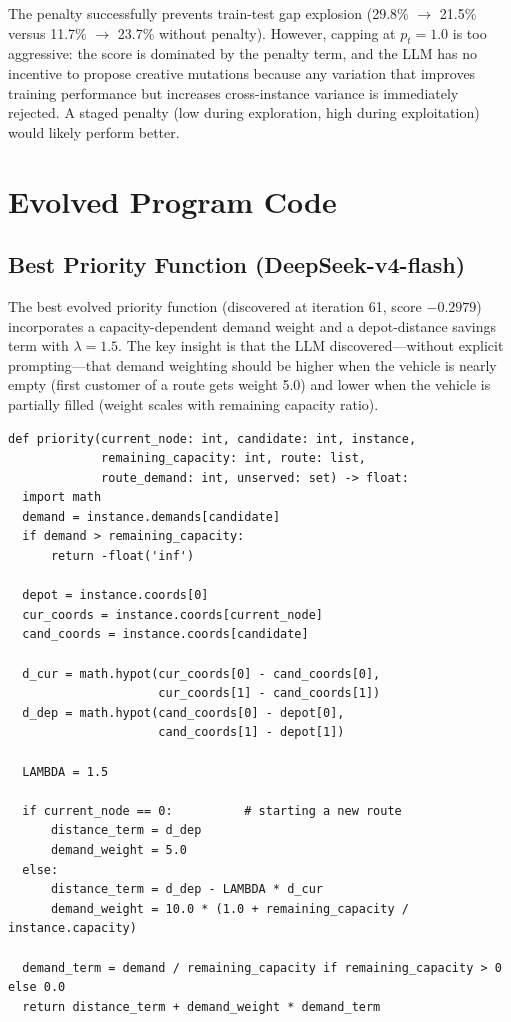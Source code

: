 \documentclass{article}
\begin{document}
The penalty successfully prevents train-test gap explosion (29.8\% $\to$ 21.5\% versus 11.7\% $\to$ 23.7\% without penalty). However, capping at $p_t = 1.0$ is too aggressive: the score is dominated by the penalty term, and the LLM has no incentive to propose creative mutations because any variation that improves training performance but increases cross-instance variance is immediately rejected. A staged penalty (low during exploration, high during exploitation) would likely perform better.

\section{Evolved Program Code}
\label{app:code}

\subsection{Best Priority Function (DeepSeek-v4-flash)}

The best evolved priority function (discovered at iteration 61, score $-0.2979$) incorporates a capacity-dependent demand weight and a depot-distance savings term with $\lambda = 1.5$. The key insight is that the LLM discovered---without explicit prompting---that demand weighting should be higher when the vehicle is nearly empty (first customer of a route gets weight 5.0) and lower when the vehicle is partially filled (weight scales with remaining capacity ratio).

\begin{lstlisting}
def priority(current_node: int, candidate: int, instance,
             remaining_capacity: int, route: list,
             route_demand: int, unserved: set) -> float:
  import math
  demand = instance.demands[candidate]
  if demand > remaining_capacity:
      return -float('inf')

  depot = instance.coords[0]
  cur_coords = instance.coords[current_node]
  cand_coords = instance.coords[candidate]

  d_cur = math.hypot(cur_coords[0] - cand_coords[0],
                     cur_coords[1] - cand_coords[1])
  d_dep = math.hypot(cand_coords[0] - depot[0],
                     cand_coords[1] - depot[1])

  LAMBDA = 1.5

  if current_node == 0:          # starting a new route
      distance_term = d_dep
      demand_weight = 5.0
  else:
      distance_term = d_dep - LAMBDA * d_cur
      demand_weight = 10.0 * (1.0 + remaining_capacity / instance.capacity)

  demand_term = demand / remaining_capacity if remaining_capacity > 0 else 0.0
  return distance_term + demand_weight * demand_term
\end{lstlisting}
\end{document}

